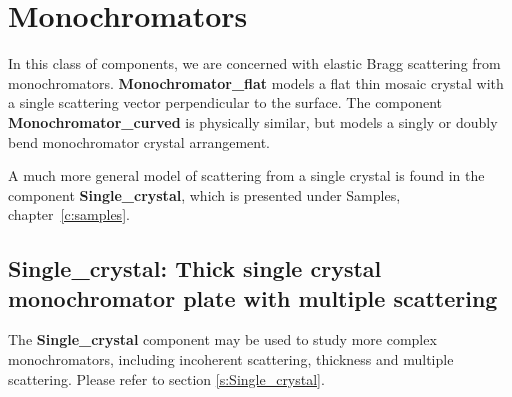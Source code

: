 
\chapter{Monochromators}

In this class of components, we are concerned with elastic Bragg
scattering from monochromators. {\bf Monochromator\_flat}
models a flat thin mosaic crystal with a single scattering vector
perpendicular to the surface.
The component {\bf Monochromator\_curved} is physically similar,
but models a singly or doubly bend monochromator crystal arrangement.

A much more general model of scattering from a single crystal is
found in the component {\bf Single\_crystal},
which is presented under Samples, chapter~\ref{c:samples}.


\newpage


\section{Single\_crystal: Thick single crystal monochromator plate with multiple scattering}

The {\bf Single\_crystal} component may be used to study more complex monochromators, including incoherent scattering, thickness and multiple scattering. Please refer to section \ref{s:Single_crystal}.

